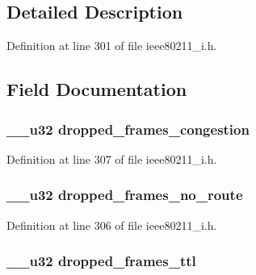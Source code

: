 \subsection{Detailed Description}


Definition at line 301 of file ieee80211\-\_\-i.\-h.



\subsection{Field Documentation}
\hypertarget{structmesh__stats_add8222dd9919110e1c8395ad1a4f6110}{
\subsubsection[{dropped\-\_\-frames\-\_\-congestion}]{\setlength{\rightskip}{0pt plus 5cm}\-\_\-\-\_\-u32 dropped\-\_\-frames\-\_\-congestion}}\label{structmesh__stats_add8222dd9919110e1c8395ad1a4f6110}


Definition at line 307 of file ieee80211\-\_\-i.\-h.

\hypertarget{structmesh__stats_a41875880a535ab024bd05d2f5f26102c}{
\subsubsection[{dropped\-\_\-frames\-\_\-no\-\_\-route}]{\setlength{\rightskip}{0pt plus 5cm}\-\_\-\-\_\-u32 dropped\-\_\-frames\-\_\-no\-\_\-route}}\label{structmesh__stats_a41875880a535ab024bd05d2f5f26102c}


Definition at line 306 of file ieee80211\-\_\-i.\-h.

\hypertarget{structmesh__stats_a4db3368b16b6cd0d3863947e74f3b968}{
\subsubsection[{dropped\-\_\-frames\-\_\-ttl}]{\setlength{\rightskip}{0pt plus 5cm}\-\_\-\-\_\-u32 dropped\-\_\-frames\-\_\-ttl}}\label{structmesh__stats_a4db3368b16b6cd0d3863947e74f3b968}


